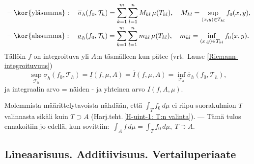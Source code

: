 %
\begin{align*}
&-\text{\kor{yläsumma}}: \quad \overline{\sigma}_h(f_0,\mathcal{T}_h)
                          =\sum_{k=1}^m\sum_{l=1}^n M_{kl}\,\mu(T_{kl}), \quad
                             M_{kl}=\sup_{(x,y)\in T_{kl}} f_0(x,y), \\
&-\text{\kor{alasumma}}: \quad \underline{\sigma}_h(f_0,\mathcal{T}_h)
                          =\sum_{k=1}^m\sum_{l=1}^n m_{kl}\,\mu(T_{kl}), \quad
                             m_{kl}=\inf_{(x,y)\in T_{kl}} f_0(x,y).
\end{align*}
Tällöin $f$ on integroituva yli $A$:n täsmälleen kun pätee
(vrt.\ Lause \ref{Riemann-integroituvuus})
\[
\sup_{\mathcal{T}_h} \underline{\sigma}_h(f_0,\mathcal{T}_h) 
                     = \underline{I}(f,\mu,A) = \overline{I}(f,\mu,A)
                     = \inf_{\mathcal{T}_h} \overline{\sigma}_h(f_0,\mathcal{T}_h),
\]
%
ja integraalin arvo = näiden - ja  yhteinen arvo $I(f,A,\mu)$.

Molemmista määrittelytavoista nähdään, että $\int_T f_0\,d\mu$ ei riipu suorakulmion $T$
valinnasta sikäli kuin $T \supset A$ (Harj.teht.\,\ref{H-uint-1: T:n valinta}). --- Tämä tulos
ennakoitiin jo edellä, kun sovittiin: $\,\int_A f\,d\mu = \int_T f_0\,d\mu,\ T \supset A$.

\subsection{Lineaarisuus. Additiivisuus. Vertailuperiaate}

